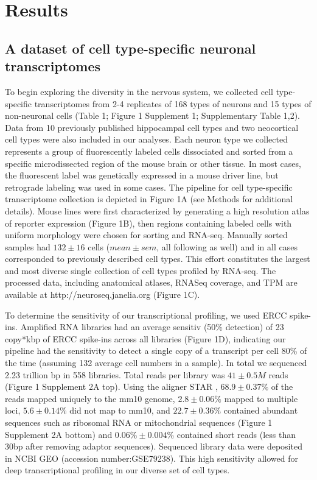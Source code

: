 \section{Results}

\subsection{A dataset of cell type-specific neuronal transcriptomes}
To begin exploring the diversity in the nervous system, we collected cell type-specific transcriptomes from 2-4 replicates of 168 types of neurons and 15 types of non-neuronal cells (Table 1; Figure 1 Supplement 1; Supplementary Table 1,2). Data from 10 previously published hippocampal cell types \citep{Cembrowski_2016} and two neocortical cell types \citep{Shima_2016} were also included in our analyses. Each neuron type we collected represents a group of fluorescently labeled cells dissociated and sorted from a specific microdissected region of the mouse brain or other tissue. In most cases, the fluorescent label was genetically expressed in a mouse driver line, but retrograde labeling was used in some cases. The pipeline for cell type-specific transcriptome collection is depicted in Figure 1A (see Methods for additional details). Mouse lines were first characterized by generating a high resolution atlas of reporter expression (Figure 1B), then regions containing labeled cells with uniform morphology were chosen for sorting and RNA-seq. Manually sorted samples had $132\pm16$ cells ($mean\pm sem$, all following as well) and in all cases corresponded to previously described cell types. This effort constitutes the largest and most diverse single collection of cell types profiled by RNA-seq. The processed data, including anatomical atlases, RNASeq coverage, and TPM are available at http://neuroseq.janelia.org (Figure 1C). 

To determine the sensitivity of our transcriptional profiling, we used ERCC spike-ins. Amplified RNA libraries had an average sensitiv (50\% detection) of 23 copy*kbp of ERCC spike-ins across all libraries (Figure 1D), indicating our pipeline had the sensitivity to detect a single copy of a transcript per cell 80\% of the time (assuming 132 average cell numbers in a sample). In total we sequenced 2.23 trillion bp in 558 libraries. Total reads per library was $41\pm0.5M$ reads (Figure 1 Supplement 2A top). Using the aligner STAR \citep{Dobin_2012}, $68.9\pm0.37\%$ of the reads mapped uniquely to the mm10 genome, $2.8\pm0.06\%$ mapped to multiple loci, $5.6\pm0.14\%$ did not map to mm10, and $22.7\pm0.36\%$ contained abundant sequences such as ribosomal RNA or mitochondrial sequences (Figure 1 Supplement 2A bottom) and $0.06\%\pm 0.004\%$ contained short reads (less than 30bp after removing adaptor sequences). Sequenced library data were deposited in NCBI GEO (accession number:GSE79238). This high sensitivity allowed for deep transcriptional profiling in our diverse set of cell types.

